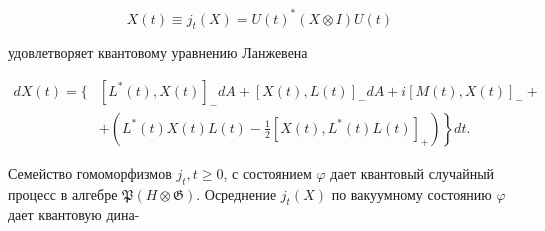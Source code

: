 \documentclass[10pt]{article}
\begin{document}
\[

X(t) \equiv j_{t}(X)=U(t)^{*}(X \otimes I) U(t)

\]



удовлетворяет квантовому уравнению Ланжевена



\[

\begin{aligned}

d X(t)=\{ & {\left[L^{*}(t), X(t)\right]_{-} d A+[X(t), L(t)]_{-} d A+i[M(t), X(t)]_{-}+} \\

& \left.+\left(L^{*}(t) X(t) L(t)-\frac{1}{2}\left[X(t), L^{*}(t) L(t)\right]_{+}\right)\right\} d t .

\end{aligned}

\]



Семейство гомоморфизмов $j_{t}, t \geqslant 0$, с состоянием $\varphi$ дает квантовый случайный процесс в алгебре $\mathfrak{P}(H \otimes \mathfrak{G})$. Осреднение $j_{t}(X)$ по вакуумному состоянию $\varphi$ дает квантовую дина-
\end{document}
